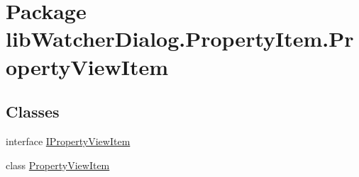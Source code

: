 \hypertarget{namespacelib_watcher_dialog_1_1_property_item_1_1_property_view_item}{\section{Package lib\+Watcher\+Dialog.\+Property\+Item.\+Property\+View\+Item}
\label{namespacelib_watcher_dialog_1_1_property_item_1_1_property_view_item}
}
\subsection*{Classes}
\begin{DoxyCompactItemize}
\item 
interface \hyperlink{interfacelib_watcher_dialog_1_1_property_item_1_1_property_view_item_1_1_i_property_view_item}{I\+Property\+View\+Item}
\item 
class \hyperlink{classlib_watcher_dialog_1_1_property_item_1_1_property_view_item_1_1_property_view_item}{Property\+View\+Item}
\end{DoxyCompactItemize}
